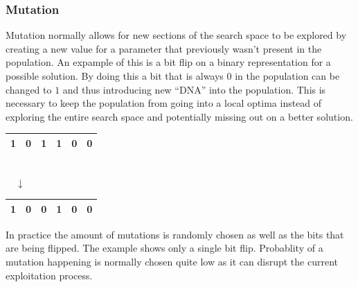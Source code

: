 \subsubsection*{Mutation}
Mutation normally allows for new sections of the search space to be explored by creating a new value for a parameter that previously wasn't present in the population.
An expample of this is a bit flip on a binary representation for a possible solution.
By doing this a bit that is always $0$ in the population can be changed to $1$ and thus introducing new ``DNA'' into the population.
This is necessary to keep the population from going into a local optima instead of exploring the entire search space and potentially missing out on a better solution. \\

\begin{center}
\begin{tabular}{|c|c|c|c|c|c|}
\hline
1 & 0 & \textbf{1} & 1 & 0 & 0 \\ 
\hline
\end{tabular}
\\
$\quad \downarrow \: \qquad \:$
\\
\begin{tabular}{|c|c|c|c|c|c|}
\hline
1 & 0 & \textbf{0} & 1 & 0 & 0 \\ \hline
\end{tabular}
\end{center}

In practice the amount of mutations is randomly chosen as well as the bits that are being flipped.
The example shows only a single bit flip.
Probablity of a mutation happening is normally chosen quite low as it can disrupt the current exploitation process.